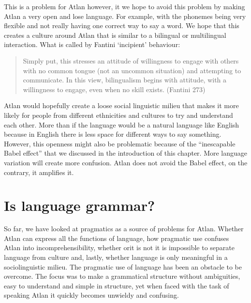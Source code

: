 This is a problem for Atlan however, it we hope to avoid this problem by making Atlan a very open and lose language. For example, with the phonemes being very flexible and not really having one correct way to say a word. We hope that this creates a culture around Atlan that is similar to a bilingual or multilingual interaction. What is called by Fantini ‘incipient’ behaviour: 

\begin{quote} 

Simply put, this stresses an attitude of willingness to 	engage with others with no common tongue (not an		uncommon situation) and attempting to communicate. In 	this view, bilingualism begins with attitude, with a 		willingness to engage, even when no skill exists.	(Fantini 273)  

\end{quote} 

Atlan would hopefully create a loose social linguistic milieu that makes it more likely for people from different ethnicities and cultures to try and understand each other. More than if the language would be a natural language like English because in English there is less space for different ways to say something. However, this openness might also be problematic because of the “inescapable Babel effect” that we discussed in the introduction of this chapter. More language variation will create more confusion. Atlan does not avoid the Babel effect, on the contrary, it amplifies it.

\section{Is language grammar?}

So far, we have looked at pragmatics as a source of problems for Atlan. Whether Atlan can express all the functions of language, how pragmatic use confuses Atlan into incomprehensibility, whether orit is not it is impossible to separate language from culture and, lastly, whether language is only meaningful in a sociolinguistic milieu. The pragmatic use of language has been an obstacle to be overcome. The focus was to make a grammatical structure without ambiguities, easy to understand and simple in structure, yet when faced with the task of speaking Atlan it quickly becomes unwieldy and confusing.			 

